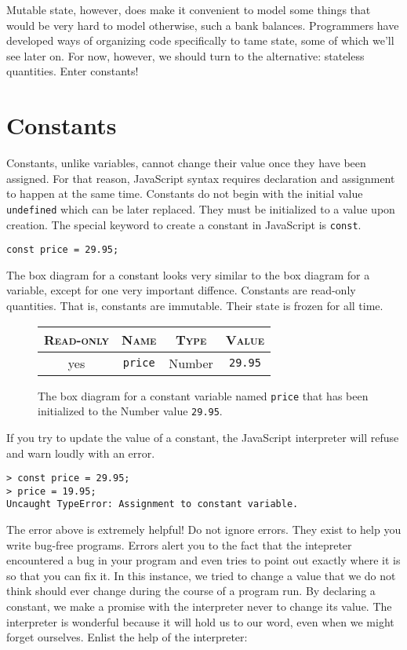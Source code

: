  Mutable state, however, does make it convenient to model some things that would be very hard to model otherwise, such a bank balances. Programmers have developed ways of organizing code specifically to tame state, some of which we'll see later on. For now, however, we should turn to the alternative: stateless quantities. Enter constants!

\section{Constants}
Constants, unlike variables, cannot change their value once they have been assigned. For that reason, JavaScript syntax requires declaration and assignment to happen at the same time. Constants do not begin with the initial value \texttt{undefined} which can be later replaced. They must be initialized to a value upon creation. The special keyword to create a constant in JavaScript is \texttt{const}.

\begin{lstlisting}
const price = 29.95;
\end{lstlisting}

The box diagram for a constant looks very similar to the box diagram for a variable, except for one very important diffence. Constants are read-only quantities. That is, constants are immutable. Their state is frozen for all time.

\begin{figure}[h]
  \sffamily
  \color{cyan}
  \begin{tabular}{|c|c|c|c|}
    \hline
    \textsc{Read-only} & \textsc{Name} & \textsc{Type} & \textsc{Value}\\
    \hline
    yes & \texttt{price} & Number & \texttt{29.95}\\
    \hline
  \end{tabular}
  \caption{\label{fig:intro-constant} The box diagram for a constant variable named \texttt{price} that has been initialized to the \textsf{Number} value \texttt{29.95}.}
\end{figure}

If you try to update the value of a constant, the JavaScript interpreter will refuse and warn loudly with an error.

\begin{lstlisting}
> const price = 29.95;
> price = 19.95;
Uncaught TypeError: Assignment to constant variable.
\end{lstlisting}

The error above is extremely helpful! Do not ignore errors. They exist to help you write bug-free programs. Errors alert you to the fact that the intepreter encountered a bug in your program and even tries to point out exactly where it is so that you can fix it. In this instance, we tried to change a value that we do not think should ever change during the course of a program run. By declaring a constant, we make a promise with the interpreter never to change its value. The interpreter is wonderful because it will hold us to our word, even when we might forget ourselves. Enlist the help of the interpreter:

